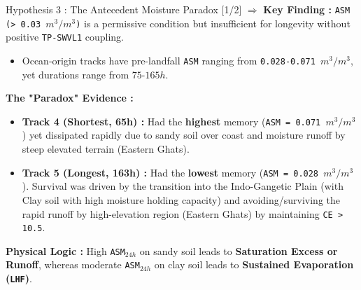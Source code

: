 \documentclass[8pt, aspectratio=169]{beamer}
\begin{document}
\begin{frame}{Hypothesis 3 : The Antecedent Moisture Paradox [1/2]}
    \vspace{0.2cm}
    \footnotesize
    $\Rightarrow$ \textbf{Key Finding :} \texttt{ASM (> 0.03 $m^3/m^3$)} is a permissive condition but insufficient for longevity without positive \texttt{TP-SWVL1} coupling.

    \vspace{0.1cm}
    \begin{itemize}
        \item Ocean-origin tracks have pre-landfall \texttt{ASM} ranging from \texttt{0.028-0.071 $m^3/m^3$}, yet durations range from $75$-$165h$.
    \end{itemize}

    \vspace{0.1cm}
    \footnotesize
    \textbf{The "Paradox" Evidence :}
    \begin{itemize}
        \item \textbf{Track 4 (Shortest, 65h) :} Had the \textbf{highest} memory (\texttt{ASM = 0.071 $m^3/m^3$}) yet dissipated rapidly due to sandy soil over coast and moisture runoff by steep elevated terrain (Eastern Ghats). \cite{clapp1978empirical}
        \item \textbf{Track 5 (Longest, 163h) :} Had the \textbf{lowest} memory (\texttt{ASM = 0.028 $m^3/m^3$}). Survival was driven by the transition into the Indo-Gangetic Plain (with Clay soil with high moisture holding capacity) and avoiding/surviving the rapid runoff by high-elevation region (Eastern Ghats) by maintaining \texttt{CE > 10.5}.
    \end{itemize}

    \vspace{0.2cm}
    \footnotesize
    \textbf{Physical Logic :} High \texttt{ASM$_{24h}$} on sandy soil leads to \textbf{Saturation Excess or Runoff}, whereas moderate \texttt{ASM$_{24h}$} on clay soil leads to \textbf{Sustained Evaporation (\texttt{LHF})}.
\end{frame}
\end{document}
